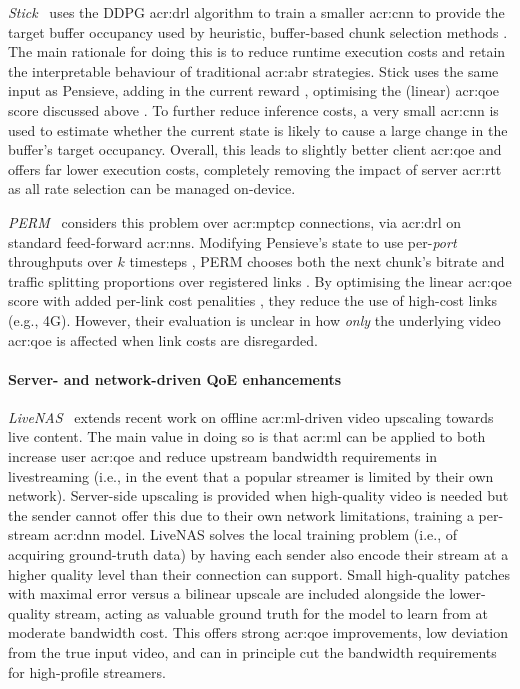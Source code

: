 \emph{Stick}~\parencite{DBLP:conf/infocom/HuangZZW0S20} uses the DDPG \gls{acr:drl} algorithm to train a smaller \gls{acr:cnn} to provide the target buffer occupancy used by heuristic, buffer-based chunk selection methods \prllitactreal{}.
The main rationale for doing this is to reduce runtime execution costs and retain the interpretable behaviour of traditional \gls{acr:abr} strategies.
Stick uses the same input as Pensieve, adding in the current reward \prllitstate{}, optimising the (linear) \gls{acr:qoe} score discussed above \prllitreward{}.
To further reduce inference costs, a very small \gls{acr:cnn} is used to estimate whether the current state is likely to cause a large change in the buffer's target occupancy.
Overall, this leads to slightly better client \gls{acr:qoe} and offers far lower execution costs, completely removing the impact of server \gls{acr:rtt} as all rate selection can be managed on-device.

\emph{PERM}~\parencite{DBLP:conf/infocom/GuanZWBXS20} considers this problem over \gls{acr:mptcp} connections, via \gls{acr:drl} on standard feed-forward \glspl{acr:nn}.
Modifying Pensieve's state to use per-\emph{port} throughputs over $k$ timesteps \prllitstate, PERM
chooses both the next chunk's bitrate and traffic splitting proportions over registered links \parenglance{$\rllitactraw\times\rllitactrealraw$}.
By optimising the linear \gls{acr:qoe} score with added per-link cost penalities \prllitreward{},
they reduce the use of high-cost links (e.g., 4G).
However, their evaluation is unclear in how \emph{only} the underlying video \gls{acr:qoe} is affected when link costs are disregarded.

\paragraph{Server- and network-driven QoE enhancements}
\emph{LiveNAS}~\parencite{DBLP:conf/sigcomm/KimJYYH20} extends recent work on offline \gls{acr:ml}-driven video upscaling towards live content.
The main value in doing so is that \gls{acr:ml} can be applied to both increase user \gls{acr:qoe} and reduce upstream bandwidth requirements in livestreaming (i.e., in the event that a popular streamer is limited by their own network).
Server-side upscaling is provided when high-quality video is needed but the sender cannot offer this due to their own network limitations, training a per-stream \gls{acr:dnn} model.
LiveNAS solves the local training problem (i.e., of acquiring ground-truth data) by having each sender also encode their stream at a higher quality level than their connection can support.
Small high-quality patches with maximal error versus a bilinear upscale are included alongside the lower-quality stream, acting as valuable ground truth for the model to learn from at moderate bandwidth cost.
This offers strong \gls{acr:qoe} improvements, low deviation from the true input video, and can in principle cut the bandwidth requirements for high-profile streamers.

